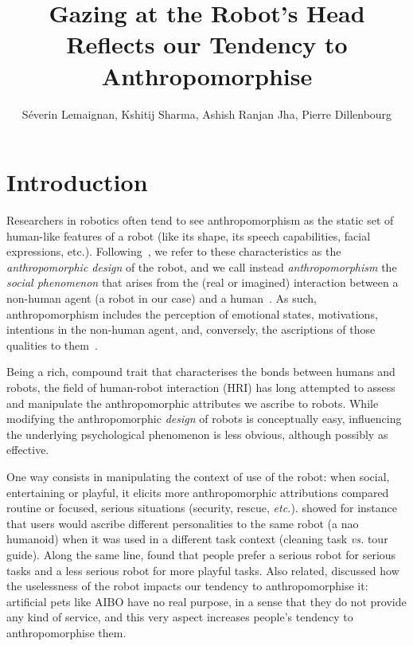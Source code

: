 \documentclass[lettersize, noapacite, twoside, HRI]{apa_HRI}
\title{Gazing at the Robot's Head Reflects our Tendency to Anthropomorphise}
\author{S\'everin Lemaignan, Kshitij Sharma, Ashish Ranjan Jha, Pierre
Dillenbourg}
\affiliation{CHILI Lab, \'Ecole Polytechnique F\'ed\'erale de Lausanne}
\newcommand{\etc}{\textit{etc.}\xspace}
\newcommand{\vs}{\textit{vs.}\xspace}
\begin{document}
\maketitle

\section{Introduction}

Researchers in robotics often tend to see anthropomorphism as the static set of
human-like features of a robot (like its shape, its speech capabilities, facial
expressions, etc.). Following~\citet{fink_anthropomorphism_2012}, we refer to
these characteristics as the \emph{anthropomorphic design} of the robot, and we
call instead \emph{anthropomorphism} the \emph{social phenomenon} that arises
from the (real or imagined) interaction between a non-human agent (a robot in
our case) and a human~\citep{persson_anthropomorphism_2000}. As such,
anthropomorphism includes the perception of emotional states, motivations,
intentions in the non-human agent, and, conversely, the ascriptions of those
qualities to them~\citep{epley_when_2008}.

Being a rich, compound trait that characterises the bonds between humans
and robots, the field of human-robot interaction (HRI) has long
attempted to assess and manipulate the anthropomorphic attributes we ascribe to robots.
While modifying the anthropomorphic \emph{design} of robots is conceptually
easy, influencing the underlying psychological phenomenon is less
obvious, although possibly as effective.

One way consists in manipulating the context of use of the robot: when social,
entertaining or playful, it elicits more anthropomorphic attributions compared
routine or focused, serious situations (security, rescue, \etc).
\citet{joosse_what_2013} showed for instance that users would ascribe
different personalities to the same robot (a {\sc nao} humanoid) when it was
used in a different task context (cleaning task \vs tour guide). Along the same
line, \citet{goetz_cooperation_2002} found that people prefer a serious robot
for serious tasks and a less serious robot for more playful tasks. Also related,
\citet{kaplan_free_2000} discussed how the uselessness of the robot impacts our
tendency to anthropomorphise it: artificial pets like AIBO have no real purpose,
in a sense that they do not provide any kind of service, and this very aspect
increases people's tendency to anthropomorphise them.
\end{document}

